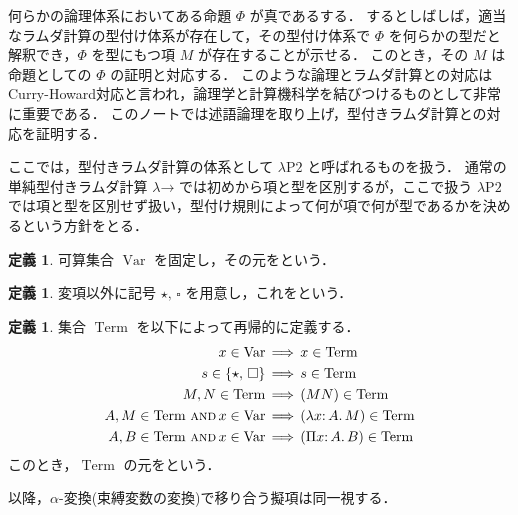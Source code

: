 \documentclass[./main]{subfiles}
\newcommand{\lam}{\lambda}
\newcommand{\ocl}{\mathord{:}}
\newcommand{\op}[1]{\mathop{\mathrm{#1}}\nolimits}
\newcommand{\typstar}{\mathord{\star}}
\newcommand{\typsq}{\mathord{\square}}
\newcommand{\textem}[1]{\textbf{\textgt{#1}}}
\newcommand{\fl}[1]{}
\newcommand{\ats}{\,}
\newcommand{\fwland}{\,\mathbin{\text{\textsc{and}}}\,}
\newcommand{\fLongrightarrow}{\,\Longrightarrow\,}
\theoremstyle{definition}
\newtheorem{defi}[theo]{定義}
\begin{document}


何らかの論理体系においてある命題 $ \varPhi $ が真であるする．
するとしばしば，適当なラムダ計算の型付け体系が存在して，その型付け体系で $ \varPhi $ を何らかの型だと解釈でき，$ \varPhi $ を型にもつ項 $ M $ が存在することが示せる．
このとき，その $ M $ は命題としての $ \varPhi $ の証明と対応する．
このような論理とラムダ計算との対応はCurry-Howard対応と言われ，論理学と計算機科学を結びつけるものとして非常に重要である．
このノートでは述語論理を取り上げ，型付きラムダ計算との対応を証明する．


ここでは，型付きラムダ計算の体系として $ \lam \mathrm{P2} $ と呼ばれるものを扱う．
通常の単純型付きラムダ計算 $ \lam \mathord{\to} $ では初めから項と型を区別するが，ここで扱う $ \lam \mathrm{P2} $ では項と型を区別せず扱い，型付け規則によって何が項で何が型であるかを決めるという方針をとる．

\begin{defi}
可算集合 $ \op{Var} $ を固定し，その元を\textem{変項\fl{variable}}という．
\end{defi}

\begin{defi}
変項以外に記号 $ \typstar,\ats \typsq $ を用意し，これを\textem{ソート\fl{sort}}という．
\end{defi}

\begin{defi}
集合 $ \op{Term} $ を以下によって再帰的に定義する．
\begin{align*}
x \in \op{Var} & \fLongrightarrow x \in \op{Term} \\
s \in \{ \typstar,\ats \typsq \} & \fLongrightarrow s \in \op{Term} \\
M, N \in \op{Term} & \fLongrightarrow (MN) \in \op{Term} \\
A, M \in \op{Term} \fwland x \in \op{Var} & \fLongrightarrow (\lam x \ocl\, A.\, M) \in \op{Term} \\
A, B \in \op{Term} \fwland x \in \op{Var} & \fLongrightarrow (\Pi x \ocl\, A.\, B) \in \op{Term}
\end{align*}
このとき，$ \op{Term} $ の元を\textem{擬項\fl{pseudoterm}}という．
\end{defi}

以降，$ \alpha $-変換(束縛変数の変換)で移り合う擬項は同一視する．
\end{document}
